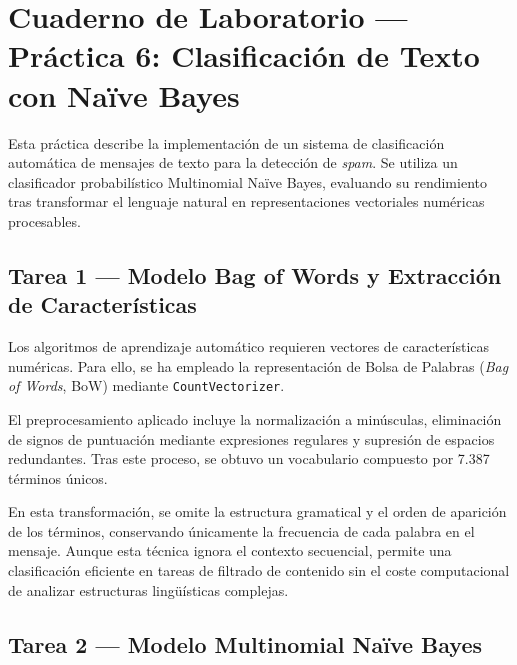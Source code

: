 \documentclass[../../__memoria.tex]{subfiles}
\begin{document}
\standalonecover
\pagestyle{cuerpo}

\graphicspath{{\subfix{../../Imagenes/}}{../../Imagenes/}{\subfix{img/}}{img/}}

\chapter[Práctica 6: Clasificador Naïve Bayes]{Cuaderno de Laboratorio --- Práctica 6: Clasificación de Texto con Naïve Bayes}

Esta práctica describe la implementación de un sistema de clasificación automática de mensajes de texto para la detección de \textit{spam}. Se utiliza un clasificador probabilístico Multinomial Naïve Bayes, evaluando su rendimiento tras transformar el lenguaje natural en representaciones vectoriales numéricas procesables.

\section[Tarea 1: Bag of Words]{Tarea 1 --- Modelo Bag of Words y Extracción de Características}

Los algoritmos de aprendizaje automático requieren vectores de características numéricas. Para ello, se ha empleado la representación de Bolsa de Palabras (\textit{Bag of Words}, BoW) mediante \texttt{CountVectorizer}.

El preprocesamiento aplicado incluye la normalización a minúsculas, eliminación de signos de puntuación mediante expresiones regulares y supresión de espacios redundantes. Tras este proceso, se obtuvo un vocabulario compuesto por 7.387 términos únicos.

En esta transformación, se omite la estructura gramatical y el orden de aparición de los términos, conservando únicamente la frecuencia de cada palabra en el mensaje. Aunque esta técnica ignora el contexto secuencial, permite una clasificación eficiente en tareas de filtrado de contenido sin el coste computacional de analizar estructuras lingüísticas complejas.

\section[Tarea 2: Naïve Bayes Multinomial]{Tarea 2 --- Modelo Multinomial Naïve Bayes}
\end{document}
